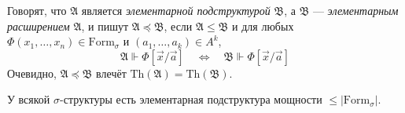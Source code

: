 \documentclass[12pt,a4paper]{article}
\newcommand{\Formul}{\ensuremath{\mathrm{Form}}\xspace}
\newcommand{\Th}{\ensuremath{\mathrm{Th}}\xspace}
\begin{document}
    \begin{definition}
        Говорят, что $\mathfrak{A}$ является \emph{элементарной подструктурой} $\mathfrak{B}$, а $\mathfrak{B}$ --- \emph{элементарным расширением} $\mathfrak{A}$, и пишут $\mathfrak{A} \preccurlyeq \mathfrak{B}$, если $\mathfrak{A} \leqslant \mathfrak{B}$ и для любых $\Phi(x_1, \dots, x_n) \in \Formul_\sigma$ и $(a_1, \dots, a_k) \in A^k$,
        \[
            \mathfrak{A} \Vdash \Phi[\vec{x}/\vec{a}]
            \quad \Longleftrightarrow \quad
            \mathfrak{B} \Vdash \Phi[\vec{x}/\vec{a}]
        \]
        Очевидно, $\mathfrak{A} \preccurlyeq \mathfrak{B}$ влечёт $\Th(\mathfrak{A}) = \Th(\mathfrak{B})$.
    \end{definition}

    \begin{theorem}
        У всякой $\sigma$-структуры есть элементарная подструктура мощности $\leqslant |\Formul_\sigma|$.
    \end{theorem}
\end{document}

